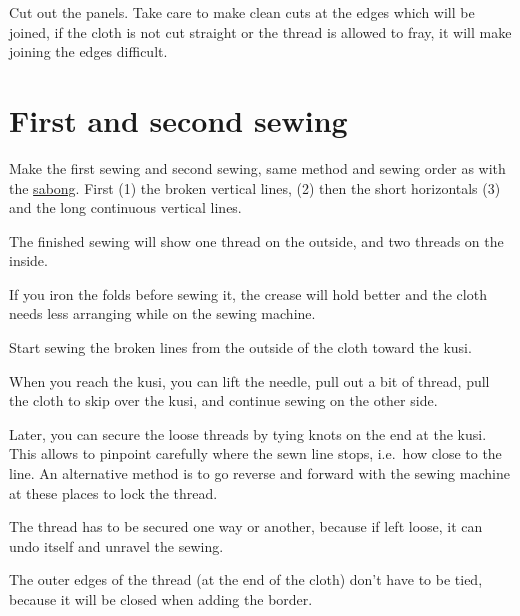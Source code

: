 Cut out the panels. Take care to make clean cuts at the edges which will
be joined, if the cloth is not cut straight or the thread is allowed to
fray, it will make joining the edges difficult.


\setlength{\nextPhotoWidth}{0.6\textwidth}


\clearpage

\section{First and second sewing}

Make the first sewing and second sewing, same method and sewing order as
with the \href{/en/sabong-guide}{sabong}. First (1) the broken vertical
lines, (2) then the short horizontals (3) and the long continuous
vertical lines.

The finished sewing will show one thread on the outside, and two threads
on the inside.


If you iron the folds before sewing it, the crease will hold better and
the cloth needs less arranging while on the sewing machine.


Start sewing the broken lines from the outside of the cloth toward the
kusi.


When you reach the kusi, you can lift the needle, pull out a bit of
thread, pull the cloth to skip over the kusi, and continue sewing on the
other side.


Later, you can secure the loose threads by tying knots on the end at the
kusi. This allows to pinpoint carefully where the sewn line stops,
i.e.~how close to the line. An alternative method is to go reverse and
forward with the sewing machine at these places to lock the thread.

The thread has to be secured one way or another, because if left loose,
it can undo itself and unravel the sewing.

The outer edges of the thread (at the end of the cloth) don't have to be
tied, because it will be closed when adding the border.

